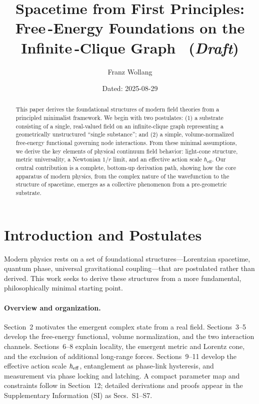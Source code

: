 \documentclass[11pt]{article}
\title{Spacetime from First Principles: Free\mbox{\,-}Energy Foundations on the Infinite\mbox{\,-}Clique Graph \, (\textit{Draft})}
\author[ ]{Franz Wollang}
\affil[ ]{\small Independent Researcher}
\date{\small Dated: 2025-08-29}
\begin{document}
\maketitle

\begin{center}
\setlength{\fboxsep}{8pt}%
\end{center}
\vspace{1em}

\begin{abstract}
This paper derives the foundational structures of modern field theories from a principled minimalist framework. We begin with two postulates: (1) a substrate consisting of a single, real-valued field on an infinite-clique graph representing a geometrically unstructured ``single substance''; and (2) a simple, volume-normalized free-energy functional governing node interactions. From these minimal assumptions, we derive the key elements of physical continuum field behavior: light-cone structure, metric universality, a Newtonian $1/r$ limit, and an effective action scale $\hbar_{\mathrm{eff}}$. Our central contribution is a complete, bottom-up derivation path, showing how the core apparatus of modern physics, from the complex nature of the wavefunction to the structure of spacetime, emerges as a collective phenomenon from a pre-geometric substrate.
\end{abstract}

\section{Introduction and Postulates}

Modern physics rests on a set of foundational structures—Lorentzian spacetime, quantum phase, universal gravitational coupling—that are postulated rather than derived. This work seeks to derive these structures from a more fundamental, philosophically minimal starting point.

\paragraph{Overview and organization.} Section~2 motivates the emergent complex state from a real field. Sections~3--5 develop the free-energy functional, volume normalization, and the two interaction channels. Sections~6--8 explain locality, the emergent metric and Lorentz cone, and the exclusion of additional long-range forces. Sections~9--11 develop the effective action scale $\hbar_{\rm eff}$, entanglement as phase-link hysteresis, and measurement via phase locking and latching. A compact parameter map and constraints follow in Section~12; detailed derivations and proofs appear in the Supplementary Information (SI) as Secs.~S1--S7.
\end{document}
